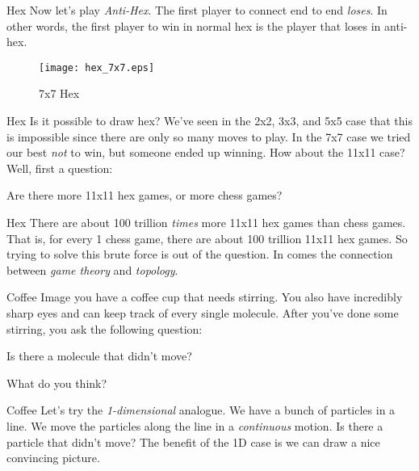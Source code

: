 \documentclass{beamer}
\begin{document}
    \begin{frame}{Hex}
        Now let's play \textit{Anti-Hex}. The first player to
        connect end to end \textit{loses}. In other words, the first
        player to win in normal hex is the player that loses in
        anti-hex.
        \begin{figure}
            \centering
            \texttt{[image: hex\_7x7.eps]}
            \caption{7x7 Hex}
            \label{fig:hex_7x7}
        \end{figure}
    \end{frame}
    \begin{frame}{Hex}
        Is it possible to draw hex? We've seen in the 2x2, 3x3, and 5x5 case that this is impossible
        since there are only so many moves to play. In the 7x7 case we tried our best \textit{not} to win,
        but someone ended up winning. How about the 11x11 case? Well, first a question:
        \begin{center}
            Are there more 11x11 hex games, or more chess games?
        \end{center}
    \end{frame}
    \begin{frame}{Hex}
        There are about 100 trillion \textit{times} more 11x11 hex games than chess games. That is, for every
        1 chess game, there are about 100 trillion 11x11 hex games. So trying to solve this brute force is
        out of the question. In comes the connection between \textit{game theory} and \textit{topology}.
    \end{frame}
    \begin{frame}{Coffee}
        Image you have a coffee cup that needs stirring. You also have incredibly sharp eyes and
        can keep track of every single molecule. After you've done some stirring, you ask the
        following question:
        \begin{center}
            Is there a molecule that didn't move?
        \end{center}
        What do you think?
    \end{frame}
    \begin{frame}{Coffee}
        Let's try the \textit{1-dimensional} analogue. We have a bunch of
        particles in a line. We move the particles along the line in a
        \textit{continuous} motion. Is there a particle that didn't move?
        The benefit of the 1D case is we can draw a nice convincing picture.
    \end{frame}
\end{document}
